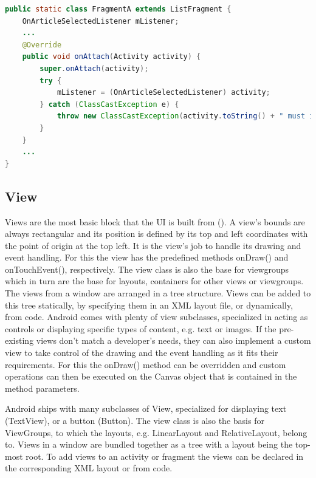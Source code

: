 \begin{lstlisting}[language=JAVA, caption=Example code for enforcing the implementation of a callback interface, label=lst:callback_interface]
public static class FragmentA extends ListFragment {
    OnArticleSelectedListener mListener;
    ...
    @Override
    public void onAttach(Activity activity) {
        super.onAttach(activity);
        try {
            mListener = (OnArticleSelectedListener) activity;
        } catch (ClassCastException e) {
            throw new ClassCastException(activity.toString() + " must implement OnArticleSelectedListener");
        }
    }
    ...
}
\end{lstlisting}

\subsection{View}
Views are the most basic block that the \gls{UI} is built from (\cite{android_view}). A view's bounds are always rectangular and its position is defined by its top and left coordinates with the point of origin at the top left. It is the view's job to handle its drawing and event handling. For this the view has the predefined methods onDraw() and onTouchEvent(), respectively. The view class is also the base for viewgroups which in turn are the base for layouts, containers for other views or viewgroups.
The views from a window are arranged in a tree structure. Views can be added to this tree statically, by specifying them in an \gls{XML} layout file, or dynamically, from code. Android comes with plenty of view subclasses, specialized in acting as controls or displaying specific types of content, e.g. text or images. If the pre-existing views don't match a developer's needs, they can also implement a custom view to take control of the drawing and the event handling as it fits their requirements. For this the onDraw() method can be overridden and custom operations can then be executed on the Canvas object that is contained in the method parameters.

Android ships with many subclasses of View, specialized for displaying text (TextView), or a button (Button). The view class is also the basis for ViewGroups, to which the layouts, e.g. LinearLayout and RelativeLayout, belong to. Views in a window are bundled together as a tree with a layout being the top-most root. To add views to an activity or fragment the views can be declared in the corresponding \gls{XML} layout or from code. 

